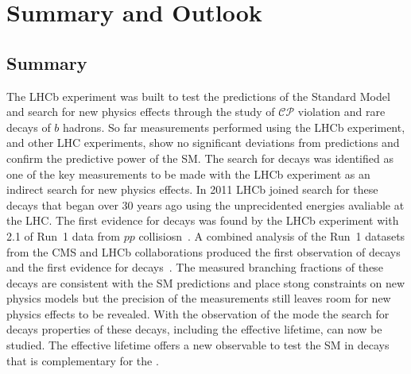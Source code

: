 \chapter{Summary and Outlook}
\label{sec:summaryandoutlook}

\section{Summary}
The LHCb experiment was built to test the predictions of the Standard Model and search for new physics effects through the study of $\mathcal{CP}$ violation and rare decays of $b$ hadrons. So far measurements performed using the LHCb experiment, and other LHC experiments, show no significant deviations from predictions and confirm the predictive power of the SM. 
The search for \bmumu decays was identified as one of the key measurements to be made with the LHCb experiment\cite{Adeva:2009ny} as an indirect search for new physics effects.
In 2011 LHCb joined search for these decays that began over 30 years ago using the unprecidented energies avaliable at the LHC. The first evidence for \bsmumu decays was found by the LHCb experiment with 2.1 \fb of Run~1 data from $pp$ collisiosn~\cite{Aaji:2012nna}.  A combined analysis of the Run~1 datasets from the CMS and LHCb collaborations produced the first observation of \bsmumu decays and the first evidence for \bdmumu decays~\cite{CMS:2014xfa}. The measured branching fractions of these decays are consistent with the SM predictions and place stong constraints on new physics models but the precision of the measurements still leaves room for new physics effects to be revealed. With the observation of the \bs mode the search for \bsmumu decays properties of these decays, including the effective lifetime, can now be studied. The effective lifetime offers a new observable to test the SM in \bsmumu decays that is complementary for the \BF. 

